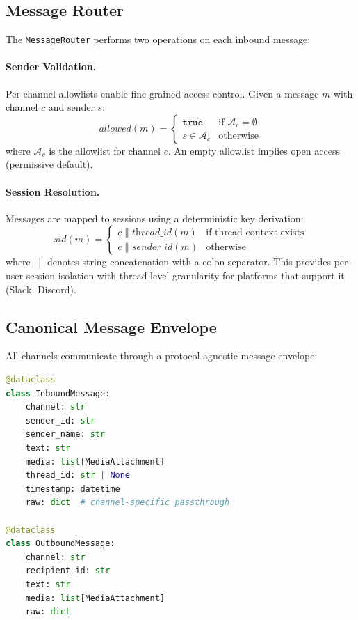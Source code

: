 \documentclass[9pt,twocolumn,letterpaper]{extarticle}
\begin{document}
\subsection{Message Router}
\label{sec:channels}

The \texttt{MessageRouter} performs two operations on each inbound message:

\paragraph{Sender Validation.}
Per-channel allowlists enable fine-grained access control.
Given a message $m$ with channel $c$ and sender $s$:
\begin{equation}
\textit{allowed}(m) = \begin{cases}
\texttt{true} & \text{if } \mathcal{A}_c = \emptyset \\
s \in \mathcal{A}_c & \text{otherwise}
\end{cases}
\label{eq:auth}
\end{equation}
where $\mathcal{A}_c$ is the allowlist for channel $c$.
An empty allowlist implies open access (permissive default).

\paragraph{Session Resolution.}
Messages are mapped to sessions using a deterministic key derivation:
\begin{equation}
\textit{sid}(m) = \begin{cases}
c \mathbin{\|} \textit{thread\_id}(m) & \text{if thread context exists} \\
c \mathbin{\|} \textit{sender\_id}(m) & \text{otherwise}
\end{cases}
\label{eq:session}
\end{equation}
where $\|$ denotes string concatenation with a colon separator.
This provides per-user session isolation with thread-level granularity for platforms that support it (Slack, Discord).

\subsection{Canonical Message Envelope}

All channels communicate through a protocol-agnostic message envelope:

\begin{lstlisting}[language=Python,caption={Message data models.},label=lst:envelope]
@dataclass
class InboundMessage:
    channel: str
    sender_id: str
    sender_name: str
    text: str
    media: list[MediaAttachment]
    thread_id: str | None
    timestamp: datetime
    raw: dict  # channel-specific passthrough

@dataclass
class OutboundMessage:
    channel: str
    recipient_id: str
    text: str
    media: list[MediaAttachment]
    raw: dict
\end{lstlisting}
\end{document}
